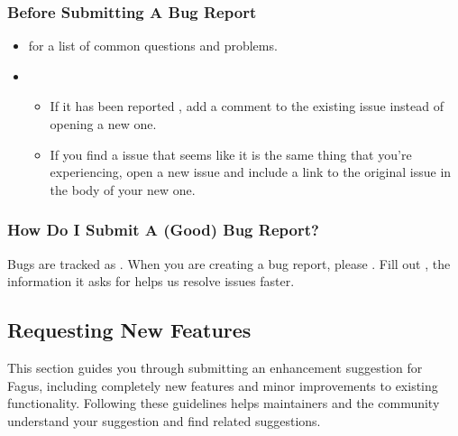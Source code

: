 \documentclass[a4paper,10pt,english]{sphinxmanual}
\begin{document}
\subsubsection{Before Submitting A Bug Report}
\label{\detokenize{CONTRIBUTING:before-submitting-a-bug-report}}\begin{itemize}
\item {}
\sphinxAtStartPar
{} for a list of common questions and problems.

\item {}
\sphinxAtStartPar
{}
\begin{itemize}
\item {}
\sphinxAtStartPar
If it has been reported , add a comment to the existing issue instead of opening a new one.

\item {}
\sphinxAtStartPar
If you find a  issue that seems like it is the same thing that you’re experiencing, open a new issue and include a link to the original issue in the body of your new one.

\end{itemize}

\end{itemize}


\subsubsection{How Do I Submit A (Good) Bug Report?}
\label{\detokenize{CONTRIBUTING:how-do-i-submit-a-good-bug-report}}
\sphinxAtStartPar
Bugs are tracked as . When you are creating a bug report, please {\hyperref[\detokenize{CONTRIBUTING:how-do-i-submit-a-good-bug-report}]{}}. Fill out , the information it asks for helps us resolve issues faster.


\subsection{Requesting New Features}
\label{\detokenize{CONTRIBUTING:requesting-new-features}}
\sphinxAtStartPar
This section guides you through submitting an enhancement suggestion for Fagus, including completely new features and minor improvements to existing functionality. Following these guidelines helps maintainers and the community understand your suggestion and find related suggestions.
\end{document}
